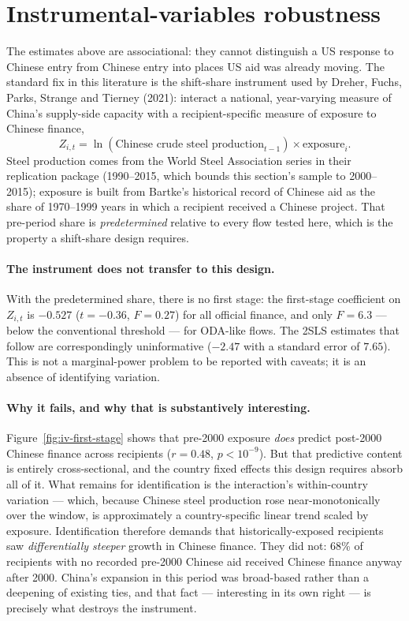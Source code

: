 \section{Instrumental-variables robustness}
\label{sec:quant-iv}
The estimates above are associational: they cannot distinguish a US response to
Chinese entry from Chinese entry into places US aid was already moving. The
standard fix in this literature is the shift-share instrument used by Dreher,
Fuchs, Parks, Strange and Tierney (2021): interact a national, year-varying
measure of China's supply-side
capacity with a recipient-specific measure of exposure to Chinese finance,
\[
Z_{i,t} = \ln(\text{Chinese crude steel production}_{t-1}) \times \text{exposure}_i .
\]
Steel production comes from the World Steel Association series in their
replication package (1990--2015, which bounds this section's sample to
2000--2015); exposure is built from Bartke's historical record of Chinese aid
as the share of 1970--1999 years in which a recipient received a Chinese
project. That pre-period share is \emph{predetermined} relative to every flow
tested here, which is the property a shift-share design requires.


\paragraph{The instrument does not transfer to this design.} With the
predetermined share, there is no first stage: the first-stage coefficient on
$Z_{i,t}$ is $-0.527$ ($t=-0.36$, $F=0.27$) for all official finance, and only
$F=6.3$ --- below the conventional threshold --- for ODA-like flows.       %
The 2SLS estimates that follow are correspondingly uninformative ($-2.47$ with
a standard error of $7.65$). This is not a marginal-power problem to be
reported with caveats; it is an absence of identifying variation.

\paragraph{Why it fails, and why that is substantively interesting.}
Figure~\ref{fig:iv-first-stage} shows that pre-2000 exposure \emph{does} predict
post-2000 Chinese finance across recipients ($r=0.48$, $p<10^{-9}$). But that
predictive content is entirely cross-sectional, and the country fixed effects
this design requires absorb all of it. What remains for identification is the
interaction's within-country variation --- which, because Chinese steel
production rose near-monotonically over the window, is approximately a
country-specific linear trend scaled by exposure. Identification therefore
demands that historically-exposed recipients saw \emph{differentially steeper}
growth in Chinese finance. They did not: 68\% of recipients with no recorded
pre-2000 Chinese aid received Chinese finance anyway after 2000. China's
expansion in this period was broad-based rather than a deepening of existing
ties, and that fact --- interesting in its own right --- is precisely what
destroys the instrument.

